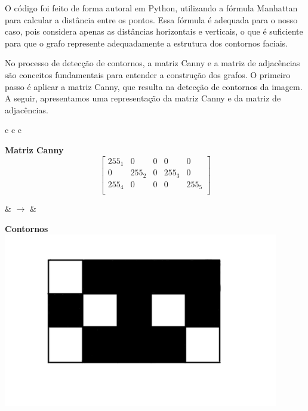 O código foi feito de forma autoral em Python, utilizando a fórmula Manhattan para calcular a distância entre os pontos. Essa fórmula é adequada para o nosso caso, pois considera apenas as distâncias horizontais e verticais, o que é suficiente para que o grafo represente adequadamente a estrutura dos contornos faciais.

No processo de detecção de contornos, a matriz Canny e a matriz de adjacências são conceitos fundamentais para entender a construção dos grafos. O primeiro passo é aplicar a matriz Canny, que resulta na detecção de contornos da imagem. A seguir, apresentamos uma representação da matriz Canny e da matriz de adjacências.

\begin{table}[ht]
    \centering
    \begin{tabular}{c c c}
        \begin{minipage}{0.4\textwidth}
            \centering
            \textbf{Matriz Canny}\\
            \[
            \begin{bmatrix}
                255_1 & 0 & 0 & 0 & 0 \\
                0 & 255_2 & 0 & 255_3 & 0 \\
                255_4 & 0 & 0 & 0 & 255_5 \\
            \end{bmatrix}
            \]
        \end{minipage}
        \hspace{0.5cm}
        
        & $\rightarrow$ &
        \begin{minipage}{0.4\textwidth}
            \centering
            \textbf{Contornos}\\ [0.2cm]
            \includegraphics[width=0.9\textwidth]{fig/contorno_canny.jpeg}
        \end{minipage}
    \end{tabular}
    \caption{Matriz Canny e seus contornos gerados}
    \label{fig:canny-contornos}
    \end{table}

